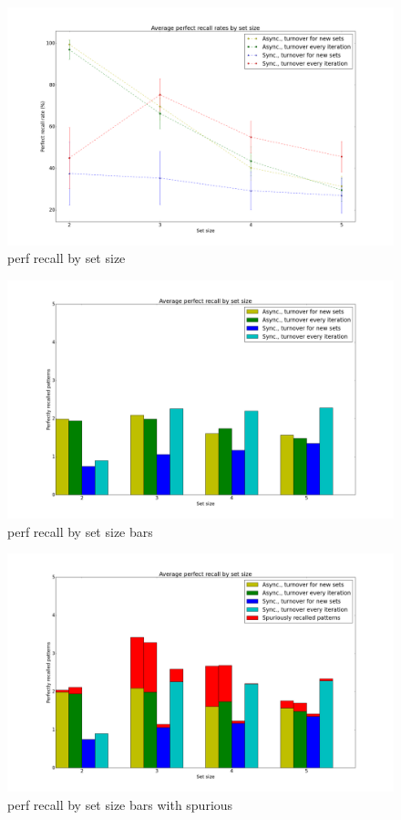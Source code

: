 \begin{figure}[h!]
    \centering
    \includegraphics[width=13cm]{fig/avg_perfect_recall_rates.png}
    \caption{perf recall by set size}
    \label{fig:avg_perfect_recall_rates}
\end{figure}

\begin{figure}[h!]
    \centering
    \includegraphics[width=13cm]{fig/avg_perfect_recall_bars.png}
    \caption{perf recall by set size bars}
    \label{fig:avg_perfect_recall_bars}
\end{figure}

\begin{figure}[h!]
    \centering
    \includegraphics[width=13cm]{fig/avg_perfect_recall_rates_with_spurious_bars.png}
    \caption{perf recall by set size bars with spurious}
    \label{fig:avg_perfect_recall_rates_with_spurious_bars}
\end{figure}


